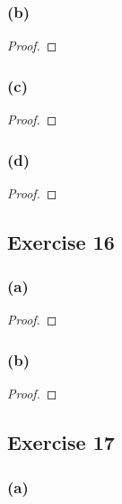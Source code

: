 \documentclass[14pt]{extarticle}
\begin{document}
\subsubsection{(b)}

\begin{proof}

\end{proof}

\subsubsection{(c)}

\begin{proof}

\end{proof}

\subsubsection{(d)}

\begin{proof}

\end{proof}

\subsection{Exercise 16}

\subsubsection{(a)}

\begin{proof}

\end{proof}

\subsubsection{(b)}

\begin{proof}

\end{proof}

\subsection{Exercise 17}

\subsubsection{(a)}
\end{document}
